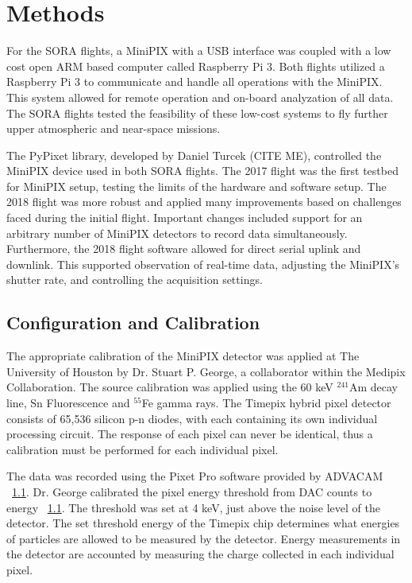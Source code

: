\section{Methods}
\label{Methods}
For the SORA flights, a MiniPIX with a USB interface was coupled with a low cost open ARM based computer called Raspberry Pi 3.  Both flights utilized a Raspberry Pi 3 to communicate and handle all operations with the MiniPIX.  This system allowed for remote operation and on-board analyzation of all data.  The SORA flights tested the feasibility of these low-cost systems to fly further upper atmospheric and near-space missions.  

The PyPixet library, developed by Daniel Turcek (CITE ME), controlled the MiniPIX device used in both SORA flights.  The 2017 flight was the first testbed for MiniPIX setup, testing the limits of the hardware and software setup.  The 2018 flight was more robust and applied many improvements based on challenges faced during the initial flight.  Important changes included support for an arbitrary number of MiniPIX detectors to record data simultaneously.  Furthermore, the 2018 flight software allowed for direct serial uplink and downlink. This supported observation of real-time data, adjusting the MiniPIX's shutter rate, and controlling the acquisition settings.

\subsection{Configuration and Calibration}
The appropriate calibration of the MiniPIX detector was applied at The University of Houston by Dr. Stuart P. George, a collaborator within the Medipix Collaboration. The source calibration was applied using the 60 keV $^{241}$Am decay line, Sn Fluorescence and $^{55}$Fe gamma rays. The Timepix hybrid pixel detector
consists of 65,536 silicon p-n diodes, with each containing its own individual processing circuit. The response
of each pixel can never be identical, thus a calibration must be performed for each individual pixel. 

The data was recorded using the Pixet Pro software provided by ADVACAM ~\ref{}. Dr. George calibrated
the pixel energy threshold from DAC counts to energy ~\ref{}. The threshold was set at 4 keV, just above
the noise level of the detector. The set threshold energy of the Timepix chip determines what energies of
particles are allowed to be measured by the detector. Energy measurements in the detector are accounted
by measuring the charge collected in each individual pixel.

